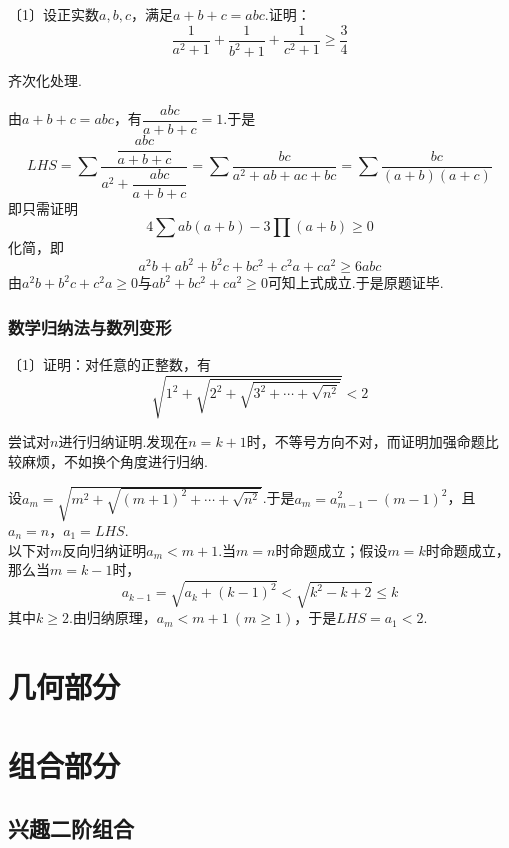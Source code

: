 \documentclass[lang=cn, zihao=4.5]{elegantbook}
\newcommand{\nd}[1]{〔#1〕}
\begin{document}
\begin{example} %
	\nd{1}设正实数$a,b,c$，满足$a+b+c=abc$.证明：$$\frac{1}{a^2+1} + \frac{1}{b^2+1} + \frac{1}{c^2+1} \geq \frac{3}{4}$$
\end{example}
\begin{hint}
	齐次化处理.
\end{hint}
\begin{solution}
	由$a+b+c=abc$，有$\dfrac{abc}{a+b+c}=1$.于是$$LHS = \sum \frac{\dfrac{abc}{a+b+c}}{a^2 + \dfrac{abc}{a+b+c}} = \sum \frac{bc}{a^2+ab+ac+bc} = \sum \frac{bc}{(a+b)(a+c)}$$
	即只需证明$$4\sum ab(a+b) - 3\prod (a+b) \geq 0$$
	化简，即$$a^2b+ab^2+b^2c+bc^2+c^2a+ca^2 \geq 6abc$$
	由$a^2b+b^2c+c^2a \geq 0$与$ab^2+bc^2+ca^2 \geq 0$可知上式成立.于是原题证毕.
\end{solution}

\section{数学归纳法与数列变形}

\begin{example} %
	\nd{1}证明：对任意的正整数，有$$\sqrt{1^2+ \sqrt{2^2+ \sqrt{3^2+ \cdots + \sqrt{n^2}}}}<2$$
\end{example}
\begin{hint}
	尝试对$n$进行归纳证明.发现在$n=k+1$时，不等号方向不对，而证明加强命题比较麻烦，不如换个角度进行归纳.
\end{hint}
\begin{solution}
	设$a_m = \sqrt{m^2+\sqrt{(m+1)^2 + \cdots + \sqrt{n^2}}}$.于是$a_m=a_{m-1}^2-(m-1)^2$，且$a_n=n$，$a_1=LHS$. \\
	以下对$m$反向归纳证明$a_m<m+1$.当$m=n$时命题成立；假设$m=k$时命题成立，那么当$m=k-1$时，$$a_{k-1} = \sqrt{a_k + (k-1)^2} < \sqrt{k^2-k+2} \leq k$$
	其中$k \geq 2$.由归纳原理，$a_m<m+1~(m \geq 1)$，于是$LHS=a_1 <2$.
\end{solution}



\part{几何部分}

\part{组合部分}

\chapter{兴趣二阶组合}
\end{document}
